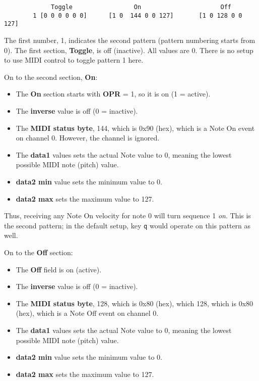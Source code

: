    \begin{verbatim}
             Toggle                 On                      Off
        1 [0 0 0 0 0 0]      [1 0  144 0 0 127]       [1 0 128 0 0 127]
   \end{verbatim}

   The first number, 1, indicates the second pattern (pattern numbering starts
   from 0).
   The first section, \textbf{Toggle}, is off (inactive).  All values are 0.
   There is no setup to use MIDI control to toggle pattern 1 here.
   
   On to the second section, \textbf{On}:

   \begin{itemize}
      \item The \textbf{On} section starts with \textbf{OPR} = 1,
         so it is on (1 = active).
      \item The \textbf{inverse} value is off (0 = inactive).
      \item The \textbf{MIDI status byte}, 144, which is 0x90 (hex), which
         is a Note On event on channel 0.  However, the channel is ignored.
      \item The \textbf{data1} values sets the actual Note value to 0,
         meaning the lowest possible MIDI note (pitch) value.
      \item \textbf{data2 min} value sets the minimum value to 0.
      \item \textbf{data2 max} sets the maximum value to 127.
   \end{itemize}

   Thus, receiving any Note On velocity for note 0 will turn sequence
   1 \textsl{on}.  This is the second pattern; in the default setup, key
   \texttt{q} would operate on this pattern as well.
   
   On to the \textbf{Off} section:

   \begin{itemize}
      \item The \textbf{Off} field is on (active).
      \item The \textbf{inverse} value is off (0 = inactive).
      \item The \textbf{MIDI status byte}, 128, which is 0x80 (hex), which
         128, which is 0x80 (hex), which is a Note Off event on channel 0.
      \item The \textbf{data1} values sets the actual Note value to 0,
         meaning the lowest possible MIDI note (pitch) value.
      \item \textbf{data2 min} value sets the minimum value to 0.
      \item \textbf{data2 max} sets the maximum value to 127.
   \end{itemize}

